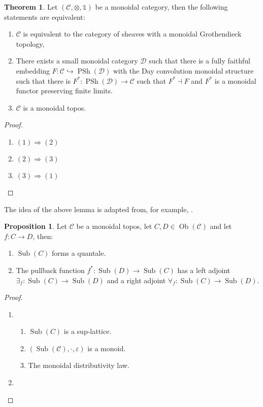 \documentclass[8pt]{article}
\theoremstyle{definition}
\theoremstyle{definition}
\newtheorem{theorem}{Theorem}[section]
\theoremstyle{definition}
\theoremstyle{definition}
\theoremstyle{definition}
\theoremstyle{definition}
\theoremstyle{definition}
\newtheorem{prop}{Proposition}[section]
\theoremstyle{definition}
\theoremstyle{definition}
\theoremstyle{definition}
\theoremstyle{definition}
\theoremstyle{definition}
\theoremstyle{definition}
\theoremstyle{question}
\newcommand{\Ob}[1]{\operatorname{Ob}({\mathcal{#1}})}
\begin{document}
\begin{theorem}

  Let $(\mathcal{C}, \otimes, \mathds{1})$ be a monoidal category, then the following statements are equivalent:
  \begin{enumerate}
    \item $\mathcal{C}$ is equivalent to the category of sheaves with a monoidal Grothendieck topology,
    \item There exists a small monoidal category $\mathcal{D}$ such that there is a fully faithful embedding
    $F : \mathcal{C} \hookrightarrow \operatorname{PSh}(\mathcal{D})$ with the Day convolution monoidal 
    structure such that there is $F^* : \operatorname{PSh}(\mathcal{D}) \to \mathcal{C}$
    such that $F^{*} \dashv F$ and $F^*$ is a monoidal functor preserving finite limits.
    \item $\mathcal{C}$ is a monoidal topos.
  \end{enumerate}

\end{theorem}

\begin{proof}
  $ $

  \begin{enumerate}
    \item $(1) \Rightarrow (2)$
    \item $(2) \Rightarrow (3)$
    \item $(3) \Rightarrow (1)$
  \end{enumerate}
\end{proof}


The idea of the above lemma is adapted from, for example, \cite[Theorem 1.1.13]{caramello2018theories}.
\begin{prop}
  Let $\mathcal{C}$ be a monoidal topos, let $C, D \in \Ob{C}$
  and let $f : C \to D$, then:
  \begin{enumerate}
  \item $\operatorname{Sub}(C)$ forms a quantale.
  \item The pullback function $f^* : \operatorname{Sub}(D) \to \operatorname{Sub}(C)$
  has a left adjoint $\exists_f : \operatorname{Sub}(C) \to \operatorname{Sub}(D)$
  and a right adjoint $\forall_f : \operatorname{Sub}(C) \to \operatorname{Sub}(D)$.
  \end{enumerate}
\end{prop}

\begin{proof}
\begin{enumerate}
\item 
\begin{enumerate}
  \item $\operatorname{Sub}(C)$ is a sup-lattice.
  \item $(\operatorname{Sub}(\mathcal{C}), \cdot, \varepsilon)$ is a monoid.
  \item The monoidal distributivity law.
\end{enumerate}
\item 
\end{enumerate}
\end{proof}
\end{document}
